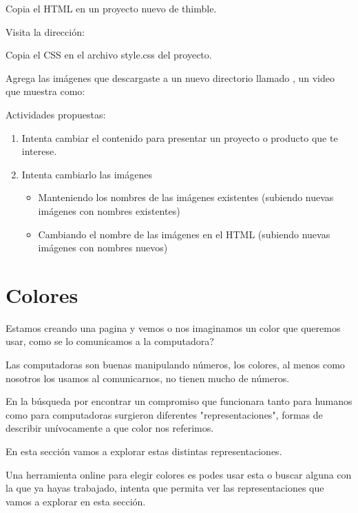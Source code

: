 \documentclass[letterpaper,10pt,spanish]{sphinxmanual}
\begin{document}
Copia el HTML en un proyecto nuevo de thimble.

Visita la dirección: 

Copia el CSS en el archivo style.css del proyecto.

Agrega las imágenes que descargaste a un nuevo directorio llamado ,
un video que muestra como:



Actividades propuestas:
\begin{enumerate}
\item {} 
Intenta cambiar el contenido para presentar un proyecto o producto que te interese.

\item {} 
Intenta cambiarlo las imágenes
\begin{itemize}
\item {} 
Manteniendo los nombres de las imágenes existentes (subiendo nuevas imágenes con nombres existentes)

\item {} 
Cambiando el nombre de las imágenes en el HTML (subiendo nuevas imágenes con nombres nuevos)

\end{itemize}

\end{enumerate}


\chapter{Colores}
\label{\detokenize{colores::doc}}\label{\detokenize{colores:colores}}
Estamos creando una pagina y vemos o nos imaginamos un color que queremos usar,
como se lo comunicamos a la computadora?

Las computadoras son buenas manipulando números, los colores, al menos como
nosotros los usamos al comunicarnos, no tienen mucho de números.

En la búsqueda por encontrar un compromiso que funcionara tanto para humanos
como para computadoras surgieron diferentes "representaciones", formas de
describir unívocamente a que color nos referimos.

En esta sección vamos a explorar estas distintas representaciones.

Una herramienta online para elegir colores es  podes usar esta o buscar alguna con la que ya hayas trabajado, intenta que permita ver las representaciones que vamos a explorar en esta sección.
\end{document}
